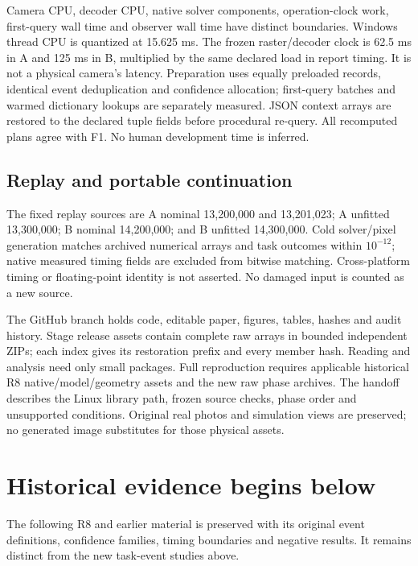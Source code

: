 Camera CPU, decoder CPU, native solver components, operation-clock work, first-query wall time and observer wall time have distinct boundaries. Windows thread CPU is quantized at 15.625 ms. The frozen raster/decoder clock is 62.5 ms in A and 125 ms in B, multiplied by the same declared load in report timing. It is not a physical camera's latency. Preparation uses equally preloaded records, identical event deduplication and confidence allocation; first-query batches and warmed dictionary lookups are separately measured. JSON context arrays are restored to the declared tuple fields before procedural re-query. All recomputed plans agree with F1. No human development time is inferred.

\subsection{Replay and portable continuation}
The fixed replay sources are A nominal 13,200,000 and 13,201,023; A unfitted 13,300,000; B nominal 14,200,000; and B unfitted 14,300,000. Cold solver/pixel generation matches archived numerical arrays and task outcomes within $10^{-12}$; native measured timing fields are excluded from bitwise matching. Cross-platform timing or floating-point identity is not asserted. No damaged input is counted as a new source.

The GitHub branch holds code, editable paper, figures, tables, hashes and audit history. Stage release assets contain complete raw arrays in bounded independent ZIPs; each index gives its restoration prefix and every member hash. Reading and analysis need only small packages. Full reproduction requires applicable historical R8 native/model/geometry assets and the new raw phase archives. The handoff describes the Linux library path, frozen source checks, phase order and unsupported conditions. Original real photos and simulation views are preserved; no generated image substitutes for those physical assets.


\FloatBarrier
\section*{Historical evidence begins below}
The following R8 and earlier material is preserved with its original event definitions, confidence families, timing boundaries and negative results. It remains distinct from the new task-event studies above.
